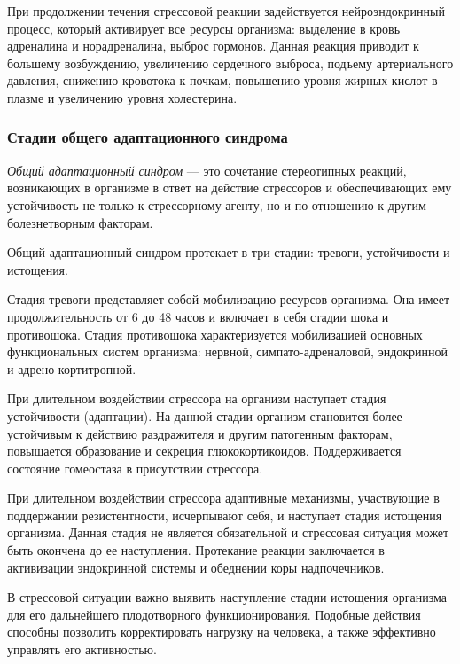 При продолжении течения стрессовой реакции задействуется нейроэндокринный процесс, который активирует все ресурсы организма: выделение в кровь адреналина и норадреналина, выброс гормонов. Данная реакция приводит к большему возбуждению, увеличению сердечного выброса, подъему артериального давления, снижению кровотока к почкам, повышению уровня жирных кислот в плазме и увеличению уровня холестерина. \cite{neuroPhysicalMechasmsOfStress}

\subsubsection{Стадии общего адаптационного синдрома}

\textit{Общий адаптационный синдром} --- это сочетание стереотипных реакций, возникающих в организме в ответ на действие стрессоров и обеспечивающих ему устойчивость не только к стрессорному агенту, но и по отношению к другим болезнетворным факторам. \cite{stressAndPatology}

Общий адаптационный синдром протекает в три стадии: тревоги, устойчивости и истощения.

Стадия тревоги представляет собой мобилизацию ресурсов организма. Она имеет продолжительность от 6 до 48 часов и включает в себя стадии шока и противошока. Стадия противошока характеризуется мобилизацией основных функциональных систем организма: нервной, симпато-адреналовой, эндокринной и адрено-кортитропной. \cite{stressAndPatology}

При длительном воздействии стрессора на организм наступает стадия устойчивости (адаптации). На данной стадии организм становится более устойчивым к действию раздражителя и другим патогенным факторам, повышается образование и секреция глюкокортикоидов. Поддерживается состояние гомеостаза в присутствии стрессора. \cite{stressAndPatology}

При длительном воздействии стрессора адаптивные механизмы, участвующие в поддержании резистентности, исчерпывают себя, и наступает стадия истощения организма. Данная стадия не является обязательной и стрессовая ситуация может быть окончена до ее наступления. Протекание реакции заключается в активизации эндокринной системы и обеднении коры надпочечников. \cite{stressAndPatology}

В стрессовой ситуации важно выявить наступление стадии истощения организма для его дальнейшего плодотворного функционирования. Подобные действия способны позволить корректировать нагрузку на человека, а также эффективно управлять его активностью.

